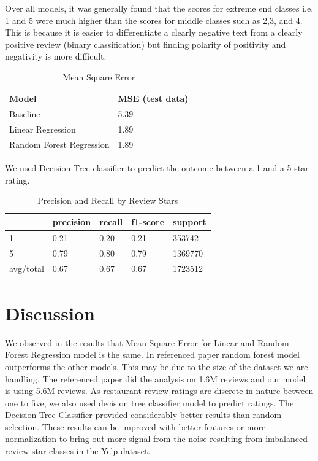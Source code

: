 \documentclass[12pt]{article}
\begin{document}
Over all models, it was generally found that the scores for extreme end classes i.e. 1 and 5 
were much higher than the scores for middle classes such as 2,3, and 4. This is because it is 
easier to differentiate a clearly negative text from a clearly positive review (binary classification)
but finding polarity of positivity and negativity is more difficult.

\begin{table}[h]
  \caption{Mean Square Error}
  \centering
  \begin{tabular}{|l|l|}
    \hline
    \textbf{Model}    & \textbf{MSE (test data)} \\
    \hline
    Baseline          & 5.39 \\
    \hline
    Linear Regression & 1.89 \\
    \hline
    Random Forest Regression & 1.89 \\
    \hline
  \end{tabular}
  \end{table}
  
  We used Decision Tree classifier to predict the outcome between a 1 and a 5 star rating.
  
  \begin{table}[h]
	\caption{Precision and Recall by Review Stars}
	\centering
	\begin{tabular}{|l|l|l|l|l|}
	\hline
    \textbf{} & \textbf{precision} & \textbf{recall} & \textbf{f1-score} & \textbf{support} \\
	\hline 
	1         & 0.21      & 0.20   & 0.21     & 353742  \\
	\hline 
	5         & 0.79      & 0.80   & 0.79     & 1369770 \\
 	\hline 
 	avg/total & 0.67      & 0.67   & 0.67     & 1723512 \\
 	\hline
\end{tabular}
\end{table}


\section{Discussion}

We observed in the results that Mean Square Error for Linear and Random Forest Regression
model is the same. In referenced paper random forest model outperforms the other models. This may
be due to the size of the dataset we are handling. The referenced paper did the analysis on 1.6M
reviews and our model is using 5.6M reviews. As restaurant review ratings are discrete in nature
between one to five, we also used decision tree classifier model to predict ratings. The
Decision Tree Classifier provided considerably better results than random selection. These
results can be improved with better features or more normalization to bring out more signal
from the noise resulting from imbalanced review star classes in the Yelp dataset.
\end{document}
